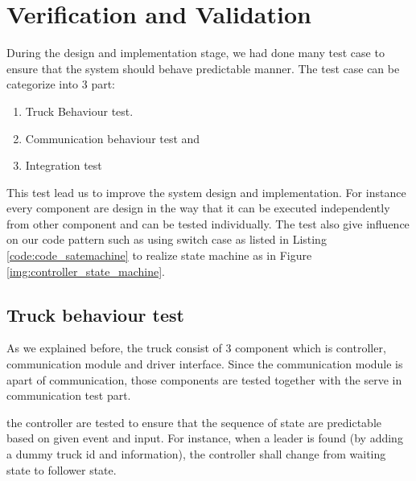 \section{Verification and Validation}
\label{sec: verification_and_validation} 

During the design and implementation stage, we had done many test case to ensure that the system should behave predictable manner. The test case can be categorize into 3 part:

\begin{enumerate}
    \item Truck Behaviour test.
    \item Communication behaviour test and
    \item Integration test
\end{enumerate}

This test lead us to improve the system design and implementation. For instance every component are design in the way that it can be executed independently from other component and can be tested individually. The test also give influence on our code pattern such as using switch case as listed in Listing \ref{code:code_satemachine} to realize state machine as in Figure \ref{img:controller_state_machine}.




\subsection{Truck behaviour test}
\label{subsec:truck_behaviour_test } 

As we explained before, the truck consist of 3 component which is controller, communication module and driver interface. Since the communication module is apart of communication, those components are tested together with the serve in communication test part.

the controller are tested to ensure that the sequence of state are predictable based on given event and input. For instance, when a leader is found (by adding a dummy truck id and information), the controller shall change from waiting state to follower state.

